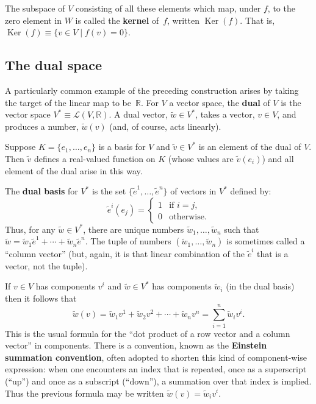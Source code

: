 \documentclass[10pt, a4paper, twocolumn]{article}
\newcommand{\R}{\mathbb{R}}
\newcommand{\defn}[1]{\textbf{#1}}
\DeclareMathOperator{\kernel}{Ker}
\begin{document}
The subspace of $V$ consisting of all these elements which map, under $f$, to
the zero element in $W$ is called the \defn{kernel} of~$f$, written
$\kernel(f)$. That is, $\kernel(f) \equiv \{ v\in V\mid f(v) = 0 \}$.


\subsection{The dual space}

A particularly common example of the preceding construction arises by taking the
target of the linear map to be~$\R$. For $V$ a vector space, the \defn{dual} of
$V$ is the vector space $V^* \equiv \mathcal{L}(V, \R)$. A dual vector, $\tilde{w} \in
V^*$, takes a vector, $v \in V$, and produces a number, $\tilde{w}(v)$ (and, of
course, acts linearly).

Suppose $K = \{e_1, \dotsc, e_n\}$ is a basis for $V$ and $\tilde{v} \in V^*$ is an
element of the dual of $V$. Then $\tilde{v}$ defines a real-valued function on
$K$ (whose values are $\tilde{v}(e_i)$) and all element of the dual arise in
this way.

The \defn{dual basis} for $V^*$ is the set $\{\tilde{e}^1, \dotsc,
\tilde{e}^n\}$ of vectors in $V^*$ defined by:
\begin{equation*}
  \tilde{e}^i(e_j) = \begin{cases}
    1 &\text{if $i = j$,} \\
    0 &\text{otherwise.}
  \end{cases}
\end{equation*}
Thus, for any $\tilde{w} \in V^*$, there are unique numbers $\tilde{w}_1, \dotsc,
\tilde{w}_n$ such that $\tilde{w} = \tilde{w}_1 \tilde{e}^1 + \dotsb +
\tilde{w}_n \tilde{e}^n$. The tuple of numbers $(\tilde{w}_1, \dotsc,
\tilde{w}_n)$ is sometimes called a “column vector” (but, again, it is that
linear combination of the $\tilde{e}^i$ that is a vector, not the tuple).

If $v \in V$ has components $v^i$ and $\tilde{w} \in V^*$
has components $\tilde{w}_i$ (in the dual basis) then it follows that
\begin{equation*}
  \tilde{w}(v) = \tilde{w}_1 v^1 + \tilde{w}_2 v^2 + \dotsb + \tilde{w}_n v^ n
  = \sum_{i=1}^n \tilde{w}_i v^i.
\end{equation*}
This is the usual formula for the “dot product of a row vector and a column
vector” in components. There is a convention, known as the \defn{Einstein
  summation convention}, often adopted to shorten this kind of component-wise
expression: when one encounters an index that is repeated, once as a superscript
(“up”) and once as a subscript (“down”), a summation over that index is
implied. Thus the previous formula may be written $\tilde{w}(v) = \tilde{w}_i
v^i$.
\end{document}
